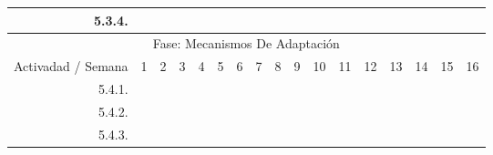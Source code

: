 \documentclass[12pt]{article}
\begin{document}
\begin{table}[H]
{\begin{tabular}{|rllllllllllllllll|}
        \multicolumn{1}{|r|}{5.3.4.} & \multicolumn{1}{l|}{} & \multicolumn{1}{l|}{} & \multicolumn{1}{l|}{} & \multicolumn{1}{l|}{} & \multicolumn{1}{l|}{} & \multicolumn{1}{l|}{} & \multicolumn{1}{l|}{} & \multicolumn{1}{l|}{} & \multicolumn{1}{l|}{} & \multicolumn{1}{c|}{\cellcolor[HTML]{B4A7D6}} & \multicolumn{1}{l|}{} & \multicolumn{1}{l|}{} & \multicolumn{1}{l|}{} & \multicolumn{1}{l|}{} & \multicolumn{1}{l|}{} &  \\ \hline
        \multicolumn{17}{|c|}{\cellcolor[HTML]{D9D9D9}Fase: Mecanismos De Adaptación} \\ \hline
        \multicolumn{1}{|l|}{\cellcolor[HTML]{D9D9D9}Activadad / Semana} & \multicolumn{1}{c|}{\cellcolor[HTML]{B6D7A8}1} & \multicolumn{1}{c|}{\cellcolor[HTML]{B6D7A8}2} & \multicolumn{1}{c|}{\cellcolor[HTML]{B6D7A8}3} & \multicolumn{1}{c|}{\cellcolor[HTML]{B6D7A8}4} & \multicolumn{1}{c|}{\cellcolor[HTML]{A4C2F4}5} & \multicolumn{1}{c|}{\cellcolor[HTML]{A4C2F4}6} & \multicolumn{1}{c|}{\cellcolor[HTML]{A4C2F4}7} & \multicolumn{1}{c|}{\cellcolor[HTML]{A4C2F4}8} & \multicolumn{1}{c|}{\cellcolor[HTML]{B4A7D6}9} & \multicolumn{1}{c|}{\cellcolor[HTML]{B4A7D6}10} & \multicolumn{1}{c|}{\cellcolor[HTML]{B4A7D6}11} & \multicolumn{1}{c|}{\cellcolor[HTML]{B4A7D6}12} & \multicolumn{1}{c|}{\cellcolor[HTML]{EA9999}13} & \multicolumn{1}{c|}{\cellcolor[HTML]{EA9999}14} & \multicolumn{1}{c|}{\cellcolor[HTML]{EA9999}15} & \multicolumn{1}{c|}{\cellcolor[HTML]{EA9999}16} \\ \hline
        \multicolumn{1}{|r|}{5.4.1.} & \multicolumn{1}{l|}{} & \multicolumn{1}{l|}{} & \multicolumn{1}{l|}{} & \multicolumn{1}{l|}{} & \multicolumn{1}{l|}{} & \multicolumn{1}{l|}{} & \multicolumn{1}{l|}{} & \multicolumn{1}{l|}{} & \multicolumn{1}{l|}{} & \multicolumn{1}{c|}{\cellcolor[HTML]{B4A7D6}} & \multicolumn{1}{c|}{\cellcolor[HTML]{B4A7D6}} & \multicolumn{1}{l|}{} & \multicolumn{1}{l|}{} & \multicolumn{1}{l|}{} & \multicolumn{1}{l|}{} &  \\ \hline
        \multicolumn{1}{|r|}{5.4.2.} & \multicolumn{1}{l|}{} & \multicolumn{1}{l|}{} & \multicolumn{1}{l|}{} & \multicolumn{1}{l|}{} & \multicolumn{1}{l|}{} & \multicolumn{1}{l|}{} & \multicolumn{1}{l|}{} & \multicolumn{1}{l|}{} & \multicolumn{1}{l|}{} & \multicolumn{1}{l|}{} & \multicolumn{1}{c|}{\cellcolor[HTML]{B4A7D6}} & \multicolumn{1}{c|}{\cellcolor[HTML]{B4A7D6}} & \multicolumn{1}{c|}{\cellcolor[HTML]{EA9999}} & \multicolumn{1}{l|}{} & \multicolumn{1}{l|}{} &  \\ \hline
        \multicolumn{1}{|r|}{5.4.3.} & \multicolumn{1}{l|}{} & \multicolumn{1}{l|}{} & \multicolumn{1}{l|}{} & \multicolumn{1}{l|}{} & \multicolumn{1}{l|}{} & \multicolumn{1}{l|}{} & \multicolumn{1}{l|}{} & \multicolumn{1}{l|}{} & \multicolumn{1}{l|}{} & \multicolumn{1}{l|}{} & \multicolumn{1}{l|}{} & \multicolumn{1}{l|}{} & \multicolumn{1}{c|}{\cellcolor[HTML]{EA9999}} & \multicolumn{1}{l|}{} & \multicolumn{1}{l|}{} &  \\ \hline

\end{tabular}}
\end{table}
\end{document}
